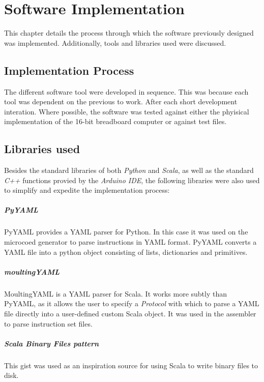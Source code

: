 \chapter{Software Implementation}
This chapter details the process through which the software previously designed
was implemented. Additionally, tools and libraries used were discussed.


\section{Implementation Process}
The different software tool were developed in sequence. This was because
each tool was dependent on the previous to work. After each short development
interation. Where possible, the software was tested against either the phyisical implementation
of the 16-bit breadboard computer or against test files.

\section{Libraries used}
Besides the standard libraries of both \emph{Python} and \emph{Scala}, as well as
the standard \emph{C++} functions provied by the \emph{Arduino IDE}, the following libraries
were also used to simplify and expedite the implementation process:
\paragraph{PyYAML} \cite{pyyaml} PyYAML provides a YAML parser for Python. In this case it was
used on the microcoed generator to parse instructions in YAML format. PyYAML converts a YAML
file into a python object consisting of lists, dictionaries and primitives.

\paragraph{moultingYAML} \cite{moultingyaml} MoultingYAML is a YAML parser for Scala. It works
more subtly than PyYAML, as it allows the user to specify a \emph{Protocol} with which to
parse a YAML file directly into a user-defined custom Scala object. It was used in the
assembler to parse instruction set files.

\paragraph{Scala Binary Files pattern} \cite{scala-bin} This gist was used as an inspiration
source for using Scala to write binary files to disk.

